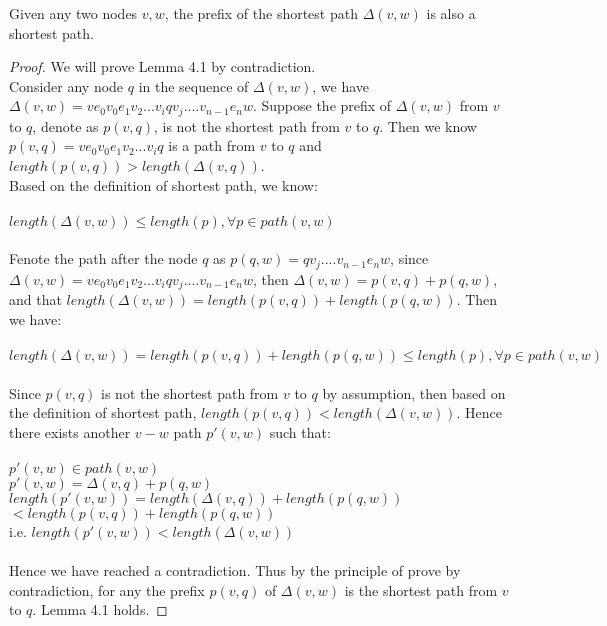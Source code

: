 \begin{sublemma}
Given any two nodes $v, w$, the prefix of the shortest path $\Delta(v, w)$ is also a shortest path. 
\end{sublemma}
\begin{proof}
We will prove Lemma 4.1 by contradiction. 
\\
Consider any node $q$ in the sequence of $\Delta(v, w)$, we have $\Delta(v, w) = ve_0v_0e_1v_2...v_i q v_j....v_{n-1}e_nw$. Suppose the prefix of $\Delta(v, w)$ from $v$ to $q$, denote as $p(v, q)$, is not the shortest path from $v$ to $q$. Then we know $p(v, q) = ve_0v_0e_1v_2...v_iq$ is a path from $v$ to $q$ and $length(p(v, q)) > length(\Delta(v, q))$. 
\\
Based on the definition of shortest path, we know: 
\\\\
\ftab $length(\Delta(v, w)) \leq length(p), \forall  p \in path(v, w)$
\\\\
Fenote the path after the node $q$ as $p(q, w) = q v_j....v_{n-1}e_nw$, since $\Delta(v, w) = ve_0v_0e_1v_2...v_i q v_j....v_{n-1}e_nw$, then $\Delta(v, w) = p(v, q) + p(q, w)$, and that $length(\Delta(v, w)) = length(p(v, q)) + length(p(q, w))$. Then we have: 
\\\\
\tab$length(\Delta(v, w)) = length(p(v, q)) + length(p(q, w)) \leq length(p), \forall p \in path(v, w)$
\\\\
Since $p(v, q)$ is not the shortest path from $v$ to $q$ by assumption, then based on the definition of shortest path, $length(p(v, q)) < length(\Delta(v, w))$. Hence there exists another $v-w$ path $p'(v, w)$ such that: 
\\\\
\ftab $p'(v, w) \in path(v, w)$\\
\ftab $p'(v, w) = \Delta(v, q) + p(q, w)$ \\ 
\ftab $length(p'(v, w)) = length(\Delta(v, q)) + length(p(q, w))$ \\ 
\ftab\tab\tab\htab\tsp$< length(p(v, q)) + length(p(q, w))$ \\
\ftab i.e. $length(p'(v, w)) < length(\Delta(v, w))$
\\\\
Hence we have reached a contradiction. Thus by the principle of prove by contradiction, for any the prefix $p(v, q)$ of $\Delta(v, w)$ is the shortest path from $v$ to $q$. Lemma 4.1 holds. 
\end{proof}
\tab \\